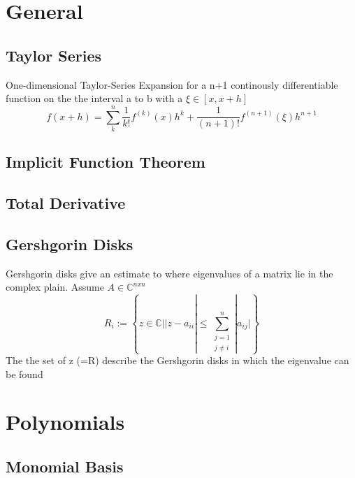 \documentclass[
    a4paper,
    11pt
]{article}
\begin{document}
\tableofcontents

\clearpage

\section{General}

\subsection{Taylor Series}

One-dimensional Taylor-Series Expansion for a n+1 continously differentiable
function on the the interval a to b with a $\xi \in [x, x+h]$
\begin{equation}
    f(x+h) = \sum_k^n \frac{1}{k!} f^{(k)}(x)h^k + \frac{1}{(n+1)!}
    f^{(n+1)}(\xi)h^{n+1}
\end{equation}

\subsection{Implicit Function Theorem}

\subsection{Total Derivative}

\subsection{Gershgorin Disks}

Gershgorin disks give an estimate to where eigenvalues of a matrix lie in the
complex plain. Assume $A \in \mathbb{C}^{n x n}$
\begin{equation}
    R_i := \left\{z \in{} \mathbb{C} |
    |z - a_{ii}| \leq{} \sum_{\substack{j=1 \\ j\neq{} i}}^{n}|a_{ij}| \right\}
\end{equation}
The the set of z (=R) describe the Gershgorin disks in which the eigenvalue can
be found


\section{Polynomials}

\subsection{Monomial Basis}
\end{document}
